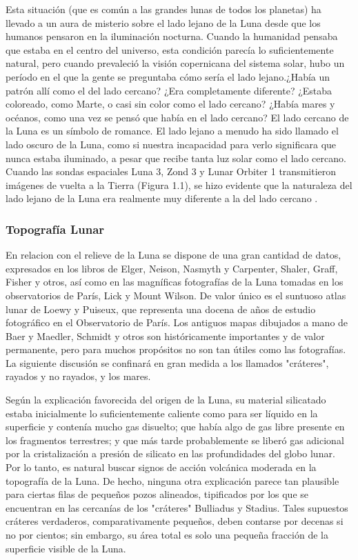 \documentclass[12pt]{article}
\begin{document}
Esta situación (que es común a las grandes lunas de todos los planetas) ha llevado a un aura de 
misterio sobre el lado lejano de la Luna desde que los humanos pensaron en la iluminación nocturna. 
Cuando la humanidad pensaba que estaba en el centro del universo, esta condición parecía lo 
suficientemente natural, pero cuando prevaleció la visión copernicana del sistema solar, hubo un 
período en el que la gente se preguntaba cómo sería el lado lejano.¿Había un patrón allí como el del 
lado cercano? ¿Era completamente diferente? ¿Estaba coloreado, como Marte, o casi sin color como el 
lado cercano? ¿Había mares y océanos, como una vez se pensó que había en el lado cercano?
El lado cercano de la Luna es un símbolo de romance. El lado lejano a menudo ha sido llamado el 
lado oscuro de la Luna, como si nuestra incapacidad para verlo significara que nunca estaba iluminado, a pesar
que recibe tanta luz solar como el lado cercano. Cuando las sondas espaciales Luna 3, Zond 3 y Lunar Orbiter 
1 transmitieron imágenes de vuelta a la Tierra (Figura 1.1), se hizo evidente que la naturaleza del 
lado lejano de la Luna era realmente muy diferente a la del lado cercano \parencite{byrne2008far}.

\subsubsection{Topografía Lunar}
En relacion con el relieve de la Luna se dispone de una gran cantidad de datos, expresados en los 
libros de Elger, Neison, Nasmyth y Carpenter, 
Shaler, Graff, Fisher y otros, así como en 
las magníficas fotografías de la Luna tomadas 
en los observatorios de París, Lick y Mount Wilson. 
De valor único es el suntuoso atlas lunar 
de Loewy y Puiseux, que representa una 
docena de años de estudio fotográfico en el Observatorio de París. 
Los antiguos mapas dibujados a mano 
de Baer y Maedler, Schmidt y otros son 
históricamente importantes y de valor permanente, 
pero para muchos propósitos no son tan útiles como las 
fotografías. La siguiente discusión se 
confinará en gran medida a los llamados "cráteres", 
rayados y no rayados, y los mares. 

Según la explicación favorecida 
del origen de la Luna, su material silicatado 
estaba inicialmente lo suficientemente caliente como para ser líquido en 
la superficie y contenía mucho gas disuelto; que 
había algo de gas libre presente en los fragmentos terrestres; 
y que más tarde probablemente se liberó gas adicional por la cristalización a presión de 
silicato en las profundidades del globo lunar. 
Por lo tanto, es natural buscar signos de acción volcánica moderada 
en la topografía de la Luna. De 
hecho, ninguna otra explicación parece tan plausible para 
ciertas filas de pequeños pozos alineados, tipificados por 
los que se encuentran en las cercanías de los "cráteres" Bulliadus y Stadius. 
Tales supuestos cráteres verdaderos, comparativamente pequeños, deben contarse por 
decenas si no por cientos; sin embargo, su área total es 
solo una pequeña fracción de la superficie visible de la 
Luna. 
\end{document}
